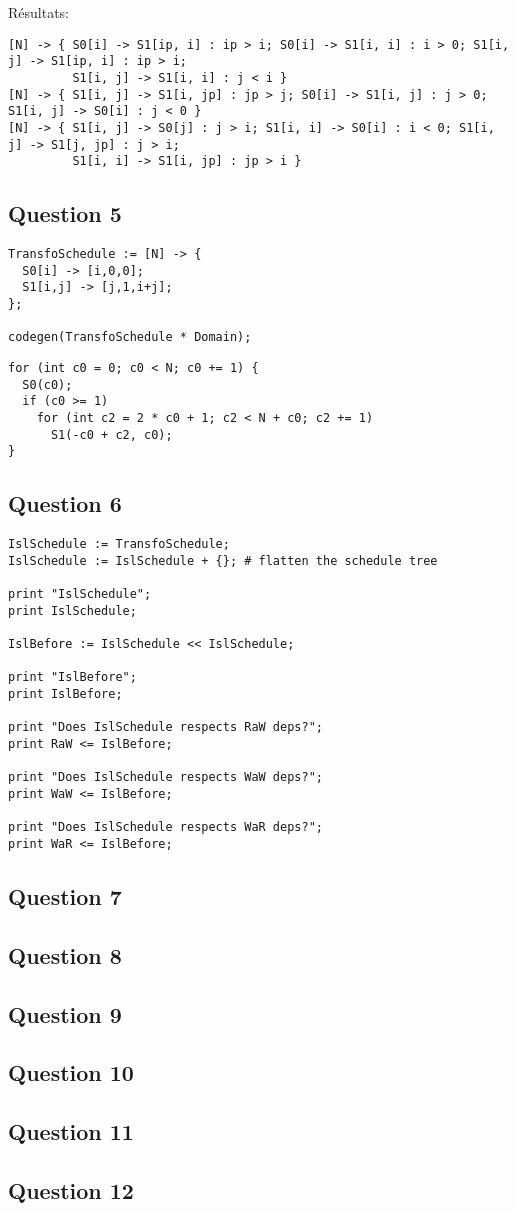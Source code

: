 \documentclass{article}
\begin{document}
Résultats:
\begin{lstlisting}
[N] -> { S0[i] -> S1[ip, i] : ip > i; S0[i] -> S1[i, i] : i > 0; S1[i, j] -> S1[ip, i] : ip > i;
         S1[i, j] -> S1[i, i] : j < i }
[N] -> { S1[i, j] -> S1[i, jp] : jp > j; S0[i] -> S1[i, j] : j > 0; S1[i, j] -> S0[i] : j < 0 }
[N] -> { S1[i, j] -> S0[j] : j > i; S1[i, i] -> S0[i] : i < 0; S1[i, j] -> S1[j, jp] : j > i;
         S1[i, i] -> S1[i, jp] : jp > i }
\end{lstlisting}

\subsection*{Question 5}
\begin{lstlisting}
TransfoSchedule := [N] -> {
  S0[i] -> [i,0,0];
  S1[i,j] -> [j,1,i+j];
};

codegen(TransfoSchedule * Domain);
\end{lstlisting}

\begin{lstlisting}
for (int c0 = 0; c0 < N; c0 += 1) {
  S0(c0);
  if (c0 >= 1)
    for (int c2 = 2 * c0 + 1; c2 < N + c0; c2 += 1)
      S1(-c0 + c2, c0);
}
\end{lstlisting}


\subsection*{Question 6}
\begin{lstlisting}
IslSchedule := TransfoSchedule; 
IslSchedule := IslSchedule + {}; # flatten the schedule tree

print "IslSchedule";
print IslSchedule;

IslBefore := IslSchedule << IslSchedule;

print "IslBefore";
print IslBefore;

print "Does IslSchedule respects RaW deps?";
print RaW <= IslBefore;

print "Does IslSchedule respects WaW deps?";
print WaW <= IslBefore;

print "Does IslSchedule respects WaR deps?";
print WaR <= IslBefore;

\end{lstlisting}

\subsection*{Question 7}

\subsection*{Question 8}

\subsection*{Question 9}

\subsection*{Question 10}

\subsection*{Question 11}

\subsection*{Question 12}
\end{document}
